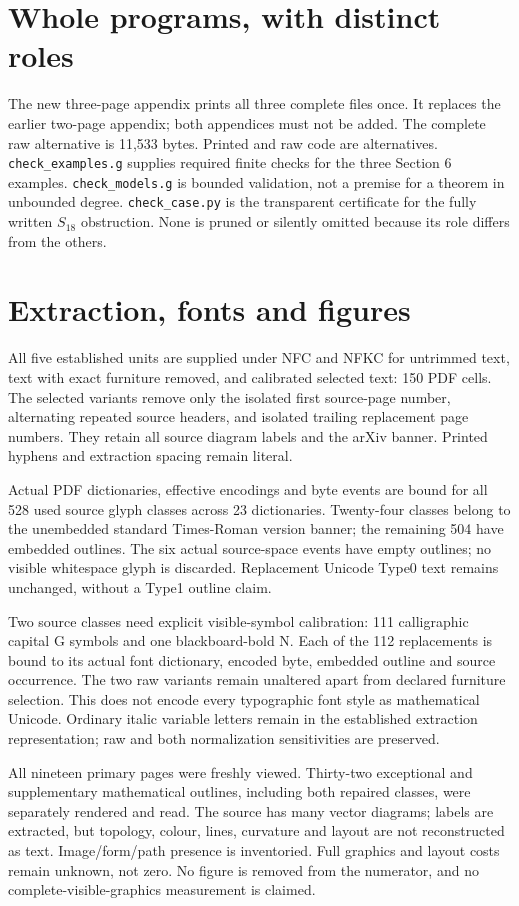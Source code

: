 \documentclass[a4paper,11pt]{article}
\begin{document}
\section*{Whole programs, with distinct roles}
The new three-page appendix prints all three complete files once. It replaces
the earlier two-page appendix; both appendices must not be added. The complete
raw alternative is 11,533 bytes. Printed and raw code are alternatives.
\texttt{check\_examples.g} supplies required finite checks for the three
Section 6 examples. \texttt{check\_models.g} is bounded validation, not a premise
for a theorem in unbounded degree. \texttt{check\_case.py} is the transparent
certificate for the fully written $S_{18}$ obstruction. None is pruned or
silently omitted because its role differs from the others.
\newpage
\section*{Extraction, fonts and figures}
All five established units are supplied under NFC and NFKC for untrimmed text,
text with exact furniture removed, and calibrated selected text: 150 PDF cells.
The selected variants remove only the isolated first source-page number,
alternating repeated source headers, and isolated trailing replacement page
numbers. They retain all source diagram labels and the arXiv banner. Printed
hyphens and extraction spacing remain literal.

Actual PDF dictionaries, effective encodings and byte events are bound for all
528 used source glyph classes across 23 dictionaries. Twenty-four classes
belong to the unembedded standard Times-Roman version banner; the remaining
504 have embedded outlines. The six actual source-space events have empty
outlines; no visible whitespace glyph is discarded. Replacement Unicode
Type0 text remains unchanged, without a Type1 outline claim.

Two source classes need explicit visible-symbol calibration: 111 calligraphic
capital G symbols and one blackboard-bold N. Each of the 112 replacements is
bound to its actual font dictionary, encoded byte, embedded outline and source
occurrence. The two raw variants remain unaltered apart from declared furniture
selection. This does not encode every typographic font style as mathematical
Unicode. Ordinary italic variable letters remain in the established extraction
representation; raw and both normalization sensitivities are preserved.

All nineteen primary pages were freshly viewed. Thirty-two exceptional and
supplementary mathematical outlines, including both repaired classes, were
separately rendered and read. The source has many vector diagrams; labels are
extracted, but topology, colour, lines, curvature and layout are not reconstructed
as text. Image/form/path presence is inventoried. Full graphics and layout costs
remain unknown, not zero. No figure is removed from the numerator, and no
complete-visible-graphics measurement is claimed.
\end{document}
